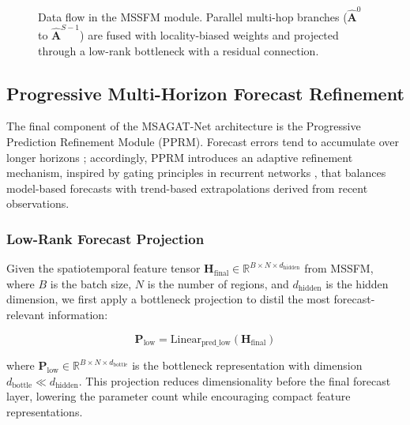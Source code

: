 \documentclass[final,1p,times]{elsarticle}
\begin{document}
\begin{figure}[!htbp]
{}%
\caption{Data flow in the MSSFM module. Parallel multi-hop branches ($\hat{\mathbf{A}}^0$ to $\hat{\mathbf{A}}^{S-1}$) are fused with locality-biased weights and projected through a low-rank bottleneck with a residual connection.}
\label{fig:mssfm_module}
\end{figure}


\subsection{Progressive Multi-Horizon Forecast Refinement}

The final component of the MSAGAT-Net architecture is the Progressive Prediction Refinement Module (PPRM). Forecast errors tend to accumulate over longer horizons \cite{BENTAIEB20127067, chandra2021evaluation}; accordingly, PPRM introduces an adaptive refinement mechanism, inspired by gating principles in recurrent networks \cite{hochreiter1997long}, that balances model-based forecasts with trend-based extrapolations derived from recent observations.


\subsubsection{Low-Rank Forecast Projection}

Given the spatiotemporal feature tensor $\mathbf{H}_{\text{final}} \in \mathbb{R}^{B \times N \times d_{\text{hidden}}}$ from MSSFM, where $B$ is the batch size, $N$ is the number of regions, and $d_{\text{hidden}}$ is the hidden dimension, we first apply a bottleneck projection to distil the most forecast-relevant information:

\begin{equation}
\mathbf{P}_{\text{low}} = \text{Linear}_{\text{pred\_low}}(\mathbf{H}_{\text{final}})
\end{equation}

where $\mathbf{P}_{\text{low}} \in \mathbb{R}^{B \times N \times d_{\text{bottle}}}$ is the bottleneck representation with dimension $d_{\text{bottle}} \ll d_{\text{hidden}}$. This projection reduces dimensionality before the final forecast layer, lowering the parameter count while encouraging compact feature representations.
\end{document}
